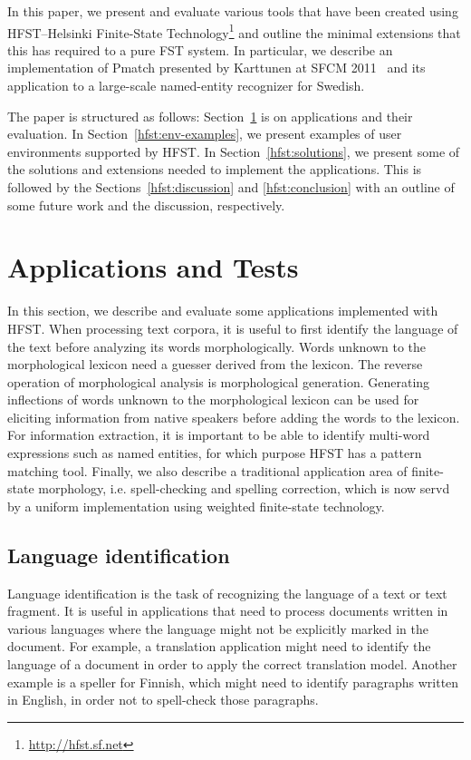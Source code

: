 \documentclass{llncs}
\begin{document}
In this paper, we present and evaluate various tools that have been created using HFST--Helsinki Finite-State Technology\footnote{\url{http://hfst.sf.net}} and outline the minimal extensions that this has required to a pure FST system. In particular, we describe an implementation of Pmatch presented by Karttunen at SFCM 2011~\cite{karttunen/2011} and its application to a large-scale named-entity recognizer for Swedish.

The paper is structured as follows: Section~\ref{hfst:structural-layout} is on applications and their evaluation.
In Section~\ref{hfst:env-examples}, we present examples of user environments supported by HFST.
In Section~\ref{hfst:solutions}, we present some of the solutions and extensions needed to implement the applications.
This is followed by the Sections~\ref{hfst:discussion} and \ref{hfst:conclusion} with an outline of some future work and the discussion, respectively.

\section{Applications and Tests}\label{hfst:structural-layout}
In this section, we describe and evaluate some applications implemented with HFST. When processing text corpora, it is useful to first identify the language of the text before analyzing its words morphologically. Words unknown to the morphological lexicon need a guesser derived from the lexicon. The reverse operation of morphological analysis is morphological generation. Generating inflections of words unknown to the morphological lexicon can be used for eliciting information from native speakers before adding the words to the lexicon. For information extraction, it is important to be able to identify multi-word expressions such as named entities, for which purpose HFST has a pattern matching tool. Finally, we also describe a traditional application area of finite-state morphology, i.e. spell-checking and spelling correction, which is now servd by a uniform implementation using weighted finite-state technology. 

\subsection{Language identification}
Language identification is the task of recognizing the language of a
text or text fragment. It is useful in applications that need to
process documents written in various languages where the language
might not be explicitly marked in the document. For example, a translation
application might need to identify the language of a document in order
to apply the correct translation model. Another example is a speller
for Finnish, which might need to identify paragraphs written in
English, in order not to spell-check those paragraphs.
\end{document}
